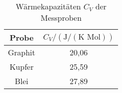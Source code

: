 \begin{table}[h]
	\begin{center}
		\begin{tabular}{cc}
		  	Probe&$C_V/(\text{J}/(\text{K } \text{Mol}))$ \\ \hline
			Graphit&20,06\\
			Kupfer&25,59\\
			Blei&27,89
		\end{tabular}
		\caption{Wärmekapazitäten $C_V$ der Messproben}
		\label{tabdiss1}
	\end{center}
\end{table}